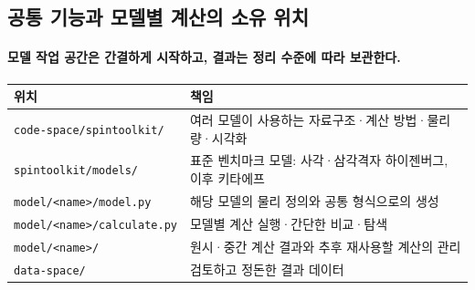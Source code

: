   \smallskip
\endgroup


\subsection{공통 기능과 모델별 계산의 소유 위치}\label{model-workspace}
\begingroup%
  \framesubtitle{모델 작업 공간은 간결하게 시작하고, 결과는 정리 수준에 따라 보관한다.}
  \begin{tabularx}{\textwidth}{@{}p{4.8cm}Y@{}}
    \toprule
    위치 & 책임 \\
    \midrule
    \texttt{code-space/spintoolkit/} & 여러 모델이 사용하는 자료구조·계산 방법·물리량·시각화 \\
    \texttt{spintoolkit/models/} & 표준 벤치마크 모델: 사각·삼각격자 하이젠버그, 이후 키타에프 \\
    \texttt{model/<name>/model.py} & 해당 모델의 물리 정의와 공통 형식으로의 생성 \\
    \texttt{model/<name>/calculate.py} & 모델별 계산 실행·간단한 비교·탐색 \\
    \texttt{model/<name>/} & 원시·중간 계산 결과와 추후 재사용할 계산의 관리 \\
    \texttt{data-space/} & 검토하고 정돈한 결과 데이터 \\
    \bottomrule
  \end{tabularx}
  \par\medskip
\endgroup

